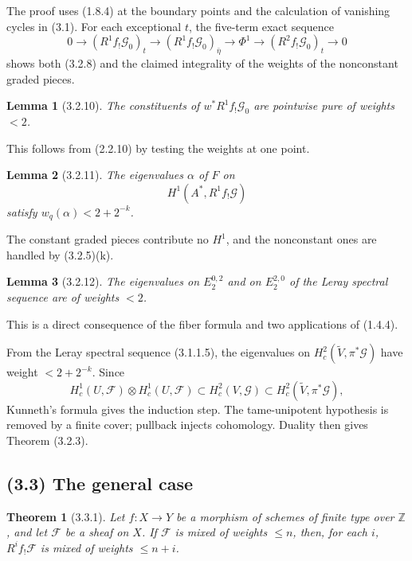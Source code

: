 \documentclass[11pt]{article}
\newtheorem{theorem}{Theorem}
\newtheorem{lemma}{Lemma}
\theoremstyle{remark}
\begin{document}
The proof uses (1.8.4) at the boundary points and the calculation of vanishing cycles in (3.1). For each exceptional $t$, the five-term exact sequence
\begin{equation}\tag{3.2.9.1}
0\to (R^1f_{!}\mathcal G_0)_t\to (R^1f_{!}\mathcal G_0)_{\bar\eta}\to \Phi^1\to (R^2f_{!}\mathcal G_0)_t\to0
\end{equation}
shows both (3.2.8) and the claimed integrality of the weights of the nonconstant graded pieces.

\begin{lemma}[3.2.10]
The constituents of $w^*R^1f_{!}\mathcal G_0$ are pointwise pure of weights $<2$.
\end{lemma}
This follows from (2.2.10) by testing the weights at one point.

\begin{lemma}[3.2.11]
The eigenvalues $\alpha$ of $F$ on
\[
H^1(A^*,R^1f_{!}\mathcal G)
\]
satisfy $w_q(\alpha)<2+2^{-k}$.
\end{lemma}
The constant graded pieces contribute no $H^1$, and the nonconstant ones are handled by (3.2.5)(k).

\begin{lemma}[3.2.12]
The eigenvalues on $E_2^{0,2}$ and on $E_2^{2,0}$ of the Leray spectral sequence are of weights $<2$.
\end{lemma}
This is a direct consequence of the fiber formula and two applications of (1.4.4).

From the Leray spectral sequence (3.1.1.5), the eigenvalues on $H^2_c(\widetilde V,\pi^*\mathcal G)$ have weight $<2+2^{-k}$. Since
\[
H^1_c(U,\mathcal F)\otimes H^1_c(U,\mathcal F)
\subset H^2_c(V,\mathcal G)
\subset H^2_c(\widetilde V,\pi^*\mathcal G),
\]
Kunneth's formula gives the induction step. The tame-unipotent hypothesis is removed by a finite cover; pullback injects cohomology. Duality then gives Theorem (3.2.3).

\subsection*{(3.3) The general case}

\begin{theorem}[3.3.1]
Let $f:X\to Y$ be a morphism of schemes of finite type over $\mathbb Z$, and let $\mathcal F$ be a sheaf on $X$. If $\mathcal F$ is mixed of weights $\le n$, then, for each $i$, $R^if_{!}\mathcal F$ is mixed of weights $\le n+i$.
\end{theorem}
\end{document}
